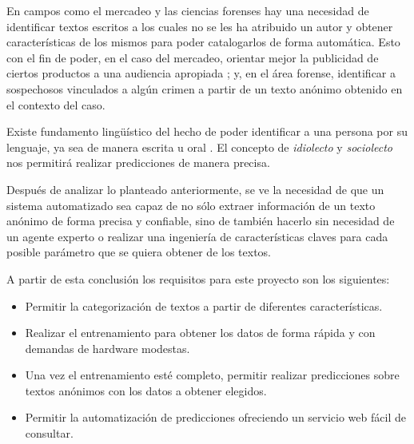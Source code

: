 En campos como el mercadeo y las ciencias forenses hay una necesidad de identificar textos escritos a los cuales no se les ha atribuido un autor y obtener características de los mismos para poder catalogarlos de forma automática. Esto con el fin de poder, en el caso del mercadeo, orientar mejor la publicidad de ciertos productos a una audiencia apropiada \parencite{aggarwal2012mining}; y, en el área forense, identificar a sospechosos vinculados a algún crimen a partir de un texto anónimo obtenido en el contexto del caso.

Existe fundamento lingüístico del hecho de poder identificar a una persona por su lenguaje, ya sea de manera escrita u oral \parencite{coulthard2004author, louwerse2004semantic}. El concepto de \textit{\gls{idiolecto}} y \textit{\gls{sociolecto}} nos permitirá realizar predicciones de manera precisa.

Después de analizar lo planteado anteriormente, se ve la necesidad de que un sistema automatizado sea capaz de no sólo extraer información de un texto anónimo de forma precisa y confiable, sino de también hacerlo sin necesidad de un agente experto o realizar una ingeniería de características claves para cada posible parámetro que se quiera obtener de los textos.

A partir de esta conclusión los requisitos para este proyecto son los siguientes:

\begin{itemize}
\item Permitir la categorización de textos a partir de diferentes características.
\item Realizar el entrenamiento para obtener los datos de forma rápida y con demandas de hardware modestas.
\item Una vez el entrenamiento esté completo, permitir realizar predicciones sobre textos anónimos con los datos a obtener elegidos.
\item Permitir la automatización de predicciones ofreciendo un servicio web fácil de consultar.
\end{itemize}

